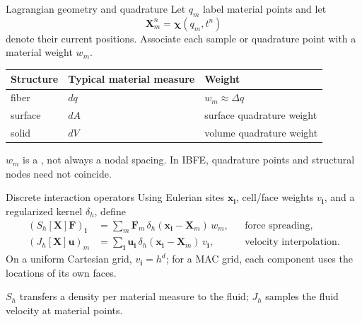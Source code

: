 \documentclass[aspectratio=169,11pt]{beamer}
\newcommand{\uvec}{\bm{u}}
\newcommand{\xvec}{\bm{x}}
\newcommand{\Xvec}{\bm{X}}
\newcommand{\Fvec}{\bm{F}}
\begin{document}
\begin{frame}{Lagrangian geometry and quadrature}
Let $q_m$ label material points and let
\[
  \Xvec_m^n=\boldsymbol{\chi}(q_m,t^n)
\]
denote their current positions. Associate each sample or quadrature point with a material weight $w_m$.
\begin{center}
\renewcommand{\arraystretch}{1.18}
\begin{tabular}{lll}
\toprule
Structure & Typical material measure & Weight \\
\midrule
fiber & $dq$ & $w_m\approx\Delta q$ \\
surface & $dA$ & surface quadrature weight \\
solid & $dV$ & volume quadrature weight \\
\bottomrule
\end{tabular}
\end{center}
\begin{punchbox}
$w_m$ is a , not always a nodal spacing. In IBFE, quadrature points and structural nodes need not coincide.
\end{punchbox}
\end{frame}

\begin{frame}{Discrete interaction operators}
Using Eulerian sites $\xvec_{\bm{i}}$, cell/face weights $v_{\bm{i}}$, and a regularized kernel $\delta_h$, define
\begin{align*}
  (S_h[\Xvec]\Fvec)_{\bm{i}}
    &=\sum_m \Fvec_m\,\delta_h(\xvec_{\bm{i}}-\Xvec_m)\,w_m,
    &&\text{force spreading},\\
  (J_h[\Xvec]\uvec)_m
    &=\sum_{\bm{i}}\uvec_{\bm{i}}\,\delta_h(\xvec_{\bm{i}}-\Xvec_m)\,v_{\bm{i}},
    &&\text{velocity interpolation}.
\end{align*}
On a uniform Cartesian grid, $v_{\bm{i}}=h^d$; for a MAC grid, each component uses the locations of its own faces.
\begin{punchbox}
$S_h$ transfers a density per material measure to the fluid; $J_h$ samples the fluid velocity at material points.
\end{punchbox}
\end{frame}
\end{document}
